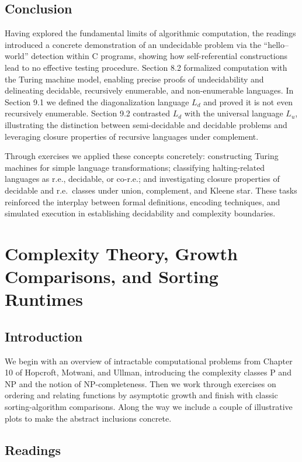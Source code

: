 \documentclass{article}
\begin{document}
\subsection{Conclusion}
Having explored the fundamental limits of algorithmic computation, the readings introduced a concrete demonstration of an undecidable problem via the “hello–world” detection within C programs, showing how self-referential constructions lead to no effective testing procedure. Section 8.2 formalized computation with the Turing machine model, enabling precise proofs of undecidability and delineating decidable, recursively enumerable, and non-enumerable languages. In Section 9.1 we defined the diagonalization language \(L_{d}\) and proved it is not even recursively enumerable. Section 9.2 contrasted \(L_{d}\) with the universal language \(L_{u}\), illustrating the distinction between semi-decidable and decidable problems and leveraging closure properties of recursive languages under complement.

Through exercises we applied these concepts concretely: constructing Turing machines for simple language transformations; classifying halting-related languages as r.e., decidable, or co-r.e.; and investigating closure properties of decidable and r.e.\ classes under union, complement, and Kleene star. These tasks reinforced the interplay between formal definitions, encoding techniques, and simulated execution in establishing decidability and complexity boundaries.

\section{Complexity Theory, Growth Comparisons, and Sorting Runtimes}

\subsection{Introduction}
We begin with an overview of intractable computational problems from Chapter 10 of Hopcroft, Motwani, and Ullman, introducing the complexity classes P and NP and the notion of NP-completeness. Then we work through exercises on ordering and relating functions by asymptotic growth and finish with classic sorting-algorithm comparisons. Along the way we include a couple of illustrative plots to make the abstract inclusions concrete.

\subsection{Readings}
\end{document}
